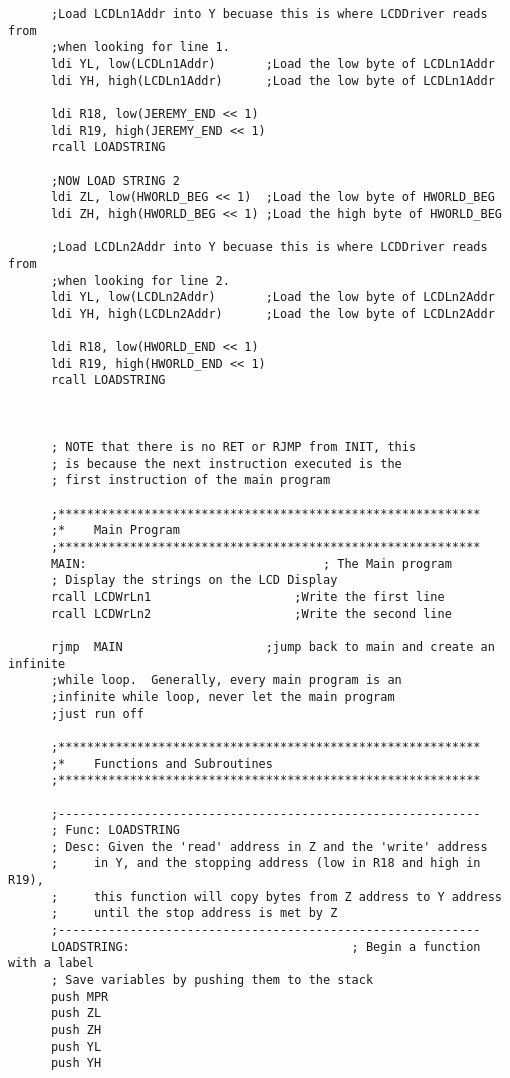\documentclass[12pt,letterpaper]{article}
\begin{document}
\begin{verbatim}
      ;Load LCDLn1Addr into Y becuase this is where LCDDriver reads from
      ;when looking for line 1. 
      ldi YL, low(LCDLn1Addr)  		;Load the low byte of LCDLn1Addr
      ldi YH, high(LCDLn1Addr) 		;Load the low byte of LCDLn1Addr
      
      ldi R18, low(JEREMY_END << 1)
      ldi R19, high(JEREMY_END << 1)
      rcall LOADSTRING
      
      ;NOW LOAD STRING 2
      ldi ZL, low(HWORLD_BEG << 1) 	;Load the low byte of HWORLD_BEG
      ldi ZH, high(HWORLD_BEG << 1)	;Load the high byte of HWORLD_BEG
      
      ;Load LCDLn2Addr into Y becuase this is where LCDDriver reads from
      ;when looking for line 2. 
      ldi YL, low(LCDLn2Addr)  		;Load the low byte of LCDLn2Addr
      ldi YH, high(LCDLn2Addr) 		;Load the low byte of LCDLn2Addr
      
      ldi R18, low(HWORLD_END << 1)
      ldi R19, high(HWORLD_END << 1)
      rcall LOADSTRING
      
      
      
      ; NOTE that there is no RET or RJMP from INIT, this
      ; is because the next instruction executed is the
      ; first instruction of the main program
      
      ;***********************************************************
      ;*	Main Program
      ;***********************************************************
      MAIN:									; The Main program
      ; Display the strings on the LCD Display
      rcall LCDWrLn1					;Write the first line
      rcall LCDWrLn2					;Write the second line
      
      rjmp	MAIN					;jump back to main and create an infinite
      ;while loop.  Generally, every main program is an
      ;infinite while loop, never let the main program
      ;just run off
      
      ;***********************************************************
      ;*	Functions and Subroutines
      ;***********************************************************
      
      ;-----------------------------------------------------------
      ; Func: LOADSTRING
      ; Desc: Given the 'read' address in Z and the 'write' address
      ;		in Y, and the stopping address (low in R18 and high in R19),
      ;		this function will copy bytes from Z address to Y address
      ;		until the stop address is met by Z
      ;-----------------------------------------------------------
      LOADSTRING:								; Begin a function with a label
      ; Save variables by pushing them to the stack
      push MPR
      push ZL
      push ZH
      push YL
      push YH
      

\end{verbatim}
\end{document}
